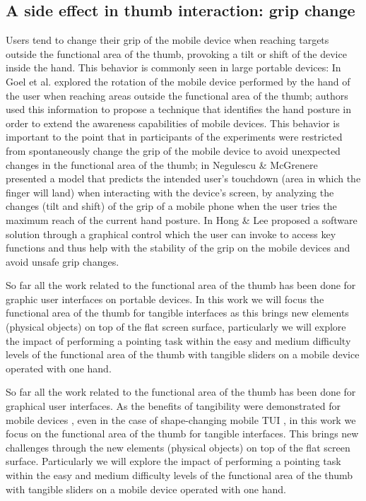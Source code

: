 \documentclass{sigchi}
\begin{document}
\subsection{A side effect in thumb interaction: grip change}
Users tend to change their grip of the mobile device when reaching targets outside the functional area of the thumb, provoking a tilt or shift of the device inside the hand. This behavior is commonly seen in large portable devices: In \cite{Goel:2012:GUB:2380116.2380184} Goel et al. explored the rotation of the mobile device performed by the hand of the user when reaching areas outside the functional area of the thumb; authors used this information to propose a technique that identifies the hand posture in order to extend the awareness capabilities of mobile devices. This behavior is important to the point that in \cite{Karlson06understandingsingle-handed,Bergstrom-Lehtovirta:2014:MFA:2611528.2557354} participants of the experiments were restricted from spontaneously change the grip of the mobile device to avoid unexpected changes in the functional area of the thumb; in \cite{Negulescu:2015:GCI:2702123.2702185} Negulescu \& McGrenere presented a model that predicts the intended user’s touchdown (area in which the finger will land) when interacting with the device’s screen, by analyzing the changes (tilt and shift) of the grip of a mobile phone when the user tries the maximum reach of the current hand posture. In \cite{Hong:2013:TVC:2468356.2468589} Hong \& Lee proposed a software solution through a graphical control which the user can invoke to access key functions and thus help with the stability of the grip on the mobile devices and avoid unsafe grip changes.

So far all the work related to the functional area of the thumb has been done for graphic user interfaces on portable devices. In this work we will focus the functional area of the thumb for tangible interfaces as this brings new elements (physical objects) on top of the flat screen surface, particularly we will explore the impact of performing a pointing task within the easy and medium difficulty levels of the functional area of the thumb with tangible sliders on a mobile device operated with one hand.

So far all the work related to the functional area of the thumb has been done for graphical user interfaces. As the benefits of tangibility were demonstrated for mobile devices \cite{Jansen:2012:TRC:2207676.2208691}, even in the case of shape-changing mobile TUI \cite{unpublished}, in this work we focus on the functional area of the thumb for tangible interfaces. This brings new challenges through the new elements (physical objects) on top of the flat screen surface. Particularly we will explore the impact of performing a pointing task within the easy and medium difficulty levels of the functional area of the thumb with tangible sliders on a mobile device operated with one hand.
\end{document}
